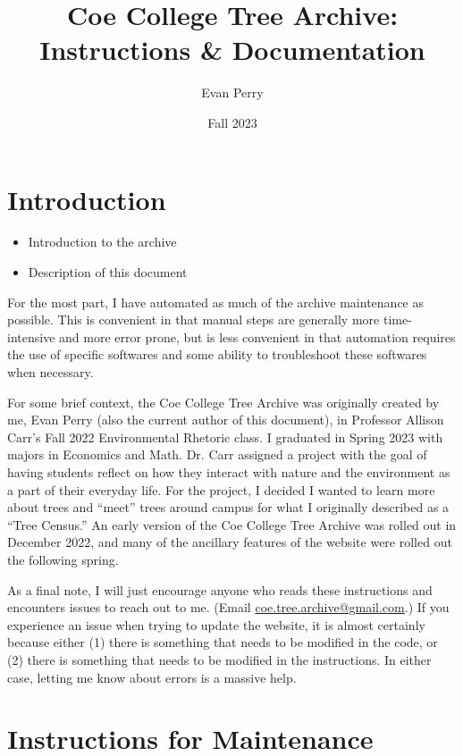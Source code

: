 \documentclass[11pt]{article}
\title{Coe College Tree Archive:\\ Instructions \& Documentation}
\author{Evan Perry}
\date{Fall 2023}
\begin{document}
\maketitle

\tableofcontents

\newpage
\section{Introduction}

\begin{itemize}
	\item Introduction to the archive
	\item Description of this document
\end{itemize}

For the most part, I have automated as much of the archive maintenance as possible. This is convenient in that manual steps are generally more time-intensive and more error prone, but is less convenient in that automation requires the use of specific softwares and some ability to troubleshoot these softwares when necessary.

For some brief context, the Coe College Tree Archive was originally created by me, Evan Perry (also the current author of this document), in Professor Allison Carr's Fall 2022 Environmental Rhetoric class. I graduated in Spring 2023 with majors in Economics and Math. Dr. Carr assigned a project with the goal of having students reflect on how they interact with nature and the environment as a part of their everyday life. For the project, I decided I wanted to learn more about trees and ``meet'' trees around campus for what I originally described as a ``Tree Census.'' An early version of the Coe College Tree Archive was rolled out in December 2022, and many of the ancillary features of the website were rolled out the following spring.

As a final note, I will just encourage anyone who reads these instructions and encounters issues to reach out to me. (Email \href{mailto:coe.tree.archive@gmail.com}{coe.tree.archive@gmail.com}.) If you experience an issue when trying to update the website, it is almost certainly because either (1) there is something that needs to be modified in the code, or (2) there is something that needs to be modified in the instructions. In either case, letting me know about errors is a massive help.

\section{Instructions for Maintenance}
\end{document}
